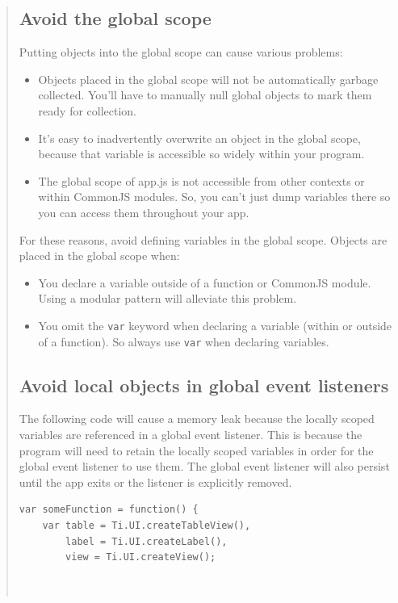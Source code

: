\documentclass[11pt]{book}
\begin{document}
\begin{quotation}\noindent
\subsection{Avoid the global scope}
Putting objects into the global scope can cause various problems:
\begin{itemize}
    \item Objects placed in the global scope will not be automatically garbage collected. You'll have to manually null global objects to mark them ready for collection.
    \item It's easy to inadvertently overwrite an object in the global scope, because that variable is accessible so widely within your program.
    \item The global scope of app.js is not accessible from other contexts or within CommonJS modules. So, you can't just dump variables there so you can access them throughout your app.
\end{itemize}

For these reasons, avoid defining variables in the global scope. Objects are placed in the global scope when:
\begin{itemize}
    \item You declare a variable outside of a function or CommonJS module. Using a modular pattern will alleviate this problem.
    \item You omit the \texttt{var} keyword when declaring a variable (within or outside of a function). So always use \texttt{var} when declaring variables.
\end{itemize}

\subsection{Avoid local objects in global event listeners}
The following code will cause a memory leak because the locally scoped variables are referenced in a global event listener. This is because the program will need to retain the locally scoped variables in order for the global event listener to use them. The global event listener will also persist until the app exits or the listener is explicitly removed.

\begin{lstlisting}[frame=single]
var someFunction = function() {
    var table = Ti.UI.createTableView(),
        label = Ti.UI.createLabel(),
        view = Ti.UI.createView();



\end{lstlisting}
\end{quotation}
\end{document}

